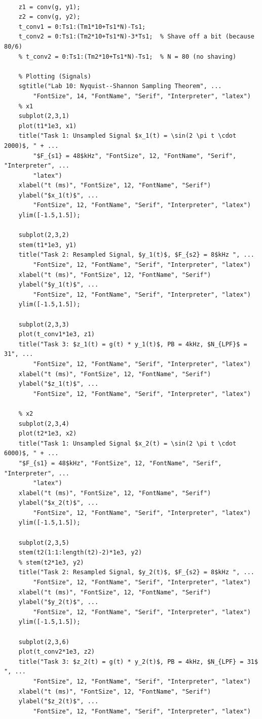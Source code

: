 \documentclass[a4paper,12pt]{article}
\begin{document}
\begin{lstlisting}
    
    z1 = conv(g, y1);
    z2 = conv(g, y2);
    t_conv1 = 0:Ts1:(Tm1*10+Ts1*N)-Ts1;
    t_conv2 = 0:Ts1:(Tm2*10+Ts1*N)-3*Ts1;  % Shave off a bit (because 80/6)
    % t_conv2 = 0:Ts1:(Tm2*10+Ts1*N)-Ts1;  % N = 80 (no shaving)
    
    % Plotting (Signals)
    sgtitle("Lab 10: Nyquist--Shannon Sampling Theorem", ...
        "FontSize", 14, "FontName", "Serif", "Interpreter", "latex")
    % x1
    subplot(2,3,1)
    plot(t1*1e3, x1)
    title("Task 1: Unsampled Signal $x_1(t) = \sin(2 \pi t \cdot 2000)$, " + ...
        "$F_{s1} = 48$kHz", "FontSize", 12, "FontName", "Serif", "Interpreter", ...
        "latex")
    xlabel("t (ms)", "FontSize", 12, "FontName", "Serif")
    ylabel("$x_1(t)$", ...
        "FontSize", 12, "FontName", "Serif", "Interpreter", "latex")
    ylim([-1.5,1.5]);
    
    subplot(2,3,2)
    stem(t1*1e3, y1)
    title("Task 2: Resampled Signal, $y_1(t)$, $F_{s2} = 8$kHz ", ...
        "FontSize", 12, "FontName", "Serif", "Interpreter", "latex")
    xlabel("t (ms)", "FontSize", 12, "FontName", "Serif")
    ylabel("$y_1(t)$", ...
        "FontSize", 12, "FontName", "Serif", "Interpreter", "latex")
    ylim([-1.5,1.5]);
    
    subplot(2,3,3)
    plot(t_conv1*1e3, z1)
    title("Task 3: $z_1(t) = g(t) * y_1(t)$, PB = 4kHz, $N_{LPF}$ = 31", ...
        "FontSize", 12, "FontName", "Serif", "Interpreter", "latex")
    xlabel("t (ms)", "FontSize", 12, "FontName", "Serif")
    ylabel("$z_1(t)$", ...
        "FontSize", 12, "FontName", "Serif", "Interpreter", "latex")
    
    % x2
    subplot(2,3,4)
    plot(t2*1e3, x2)
    title("Task 1: Unsampled Signal $x_2(t) = \sin(2 \pi t \cdot 6000)$, " + ...
    "$F_{s1} = 48$kHz", "FontSize", 12, "FontName", "Serif", "Interpreter", ...
        "latex")
    xlabel("t (ms)", "FontSize", 12, "FontName", "Serif")
    ylabel("$x_2(t)$", ...
        "FontSize", 12, "FontName", "Serif", "Interpreter", "latex")
    ylim([-1.5,1.5]);
    
    subplot(2,3,5)
    stem(t2(1:1:length(t2)-2)*1e3, y2)
    % stem(t2*1e3, y2)
    title("Task 2: Resampled Signal, $y_2(t)$, $F_{s2} = 8$kHz ", ...
        "FontSize", 12, "FontName", "Serif", "Interpreter", "latex")
    xlabel("t (ms)", "FontSize", 12, "FontName", "Serif")
    ylabel("$y_2(t)$", ...
        "FontSize", 12, "FontName", "Serif", "Interpreter", "latex")
    ylim([-1.5,1.5]);
    
    subplot(2,3,6)
    plot(t_conv2*1e3, z2)
    title("Task 3: $z_2(t) = g(t) * y_2(t)$, PB = 4kHz, $N_{LPF} = 31$ ", ...
        "FontSize", 12, "FontName", "Serif", "Interpreter", "latex")
    xlabel("t (ms)", "FontSize", 12, "FontName", "Serif")
    ylabel("$z_2(t)$", ...
        "FontSize", 12, "FontName", "Serif", "Interpreter", "latex")
    

\end{lstlisting}
\end{document}
